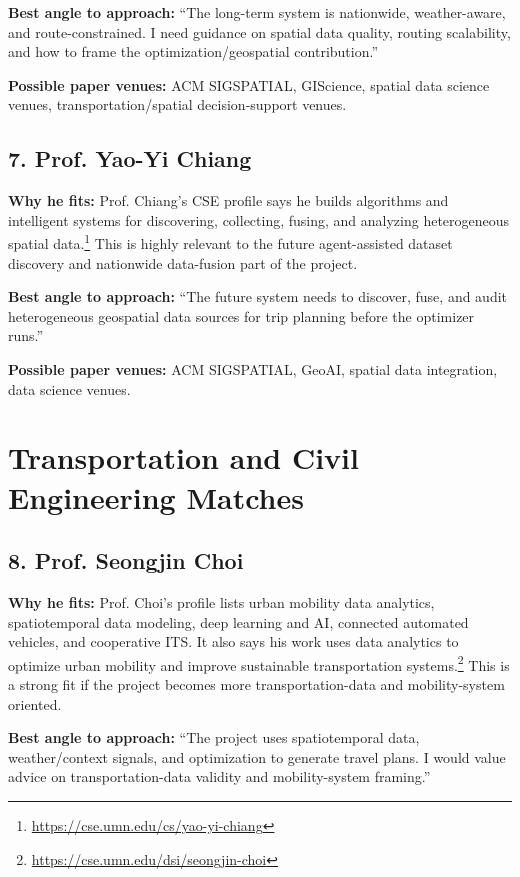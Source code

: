 \documentclass[11pt,a4paper]{article}
\begin{document}
\noindent \textbf{Best angle to approach:} ``The long-term system is nationwide, weather-aware, and route-constrained. I need guidance on spatial data quality, routing scalability, and how to frame the optimization/geospatial contribution.''

\noindent \textbf{Possible paper venues:} ACM SIGSPATIAL, GIScience, spatial data science venues, transportation/spatial decision-support venues.

\subsection*{7. Prof. Yao-Yi Chiang}

\noindent \textbf{Why he fits:} Prof. Chiang's CSE profile says he builds algorithms and intelligent systems for discovering, collecting, fusing, and analyzing heterogeneous spatial data.\footnote{\url{https://cse.umn.edu/cs/yao-yi-chiang}} This is highly relevant to the future agent-assisted dataset discovery and nationwide data-fusion part of the project.

\noindent \textbf{Best angle to approach:} ``The future system needs to discover, fuse, and audit heterogeneous geospatial data sources for trip planning before the optimizer runs.''

\noindent \textbf{Possible paper venues:} ACM SIGSPATIAL, GeoAI, spatial data integration, data science venues.

\section*{Transportation and Civil Engineering Matches}

\subsection*{8. Prof. Seongjin Choi}

\noindent \textbf{Why he fits:} Prof. Choi's profile lists urban mobility data analytics, spatiotemporal data modeling, deep learning and AI, connected automated vehicles, and cooperative ITS. It also says his work uses data analytics to optimize urban mobility and improve sustainable transportation systems.\footnote{\url{https://cse.umn.edu/dsi/seongjin-choi}} This is a strong fit if the project becomes more transportation-data and mobility-system oriented.

\noindent \textbf{Best angle to approach:} ``The project uses spatiotemporal data, weather/context signals, and optimization to generate travel plans. I would value advice on transportation-data validity and mobility-system framing.''
\end{document}
